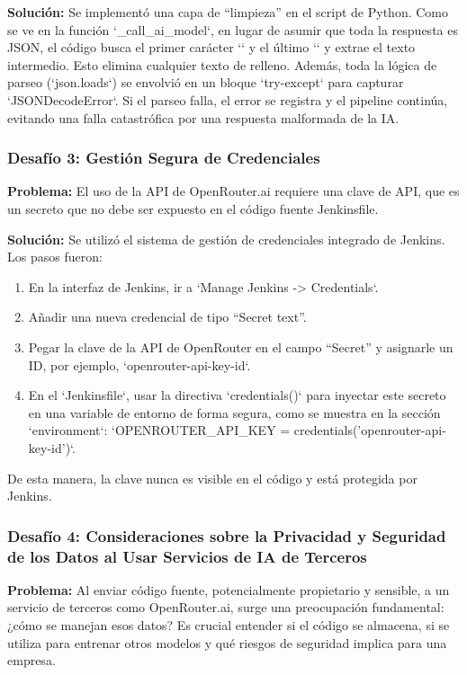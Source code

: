 \textbf{Solución:} Se implementó una capa de ``limpieza'' en el script de Python. Como se ve en la función `\_call\_ai\_model`, en lugar de asumir que toda la respuesta es JSON, el código busca el primer carácter `{` y el último `}` y extrae el texto intermedio. Esto elimina cualquier texto de relleno. Además, toda la lógica de parseo (`json.loads`) se envolvió en un bloque `try-except` para capturar `JSONDecodeError`. Si el parseo falla, el error se registra y el pipeline continúa, evitando una falla catastrófica por una respuesta malformada de la IA.

\subsubsection{Desafío 3: Gestión Segura de Credenciales}
\textbf{Problema:} El uso de la API de OpenRouter.ai requiere una clave de API, que es un secreto que no debe ser expuesto en el código fuente Jenkinsfile.

\textbf{Solución:} Se utilizó el sistema de gestión de credenciales integrado de Jenkins. Los pasos fueron:
\begin{enumerate}
    \item En la interfaz de Jenkins, ir a `Manage Jenkins -> Credentials`.
    \item Añadir una nueva credencial de tipo ``Secret text''.
    \item Pegar la clave de la API de OpenRouter en el campo ``Secret'' y asignarle un ID, por ejemplo, `openrouter-api-key-id`.
    \item En el `Jenkinsfile`, usar la directiva `credentials()` para inyectar este secreto en una variable de entorno de forma segura, como se muestra en la sección `environment`: `OPENROUTER\_API\_KEY = credentials('openrouter-api-key-id')`.
\end{enumerate}
De esta manera, la clave nunca es visible en el código y está protegida por Jenkins.

\subsubsection{Desafío 4: Consideraciones sobre la Privacidad y Seguridad de los Datos al Usar Servicios de IA de Terceros}
\label{sec:privacidad_datos}

\textbf{Problema:} Al enviar código fuente, potencialmente propietario y sensible, a un servicio de terceros como OpenRouter.ai, surge una preocupación fundamental: ¿cómo se manejan esos datos? Es crucial entender si el código se almacena, si se utiliza para entrenar otros modelos y qué riesgos de seguridad implica para una empresa.

